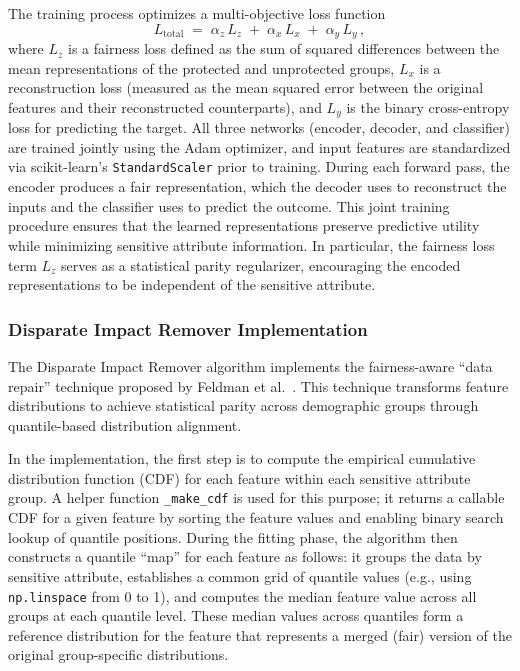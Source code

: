 \documentclass[12pt,a4paper,openright,twoside]{book}
\begin{document}
The training process optimizes a multi-objective loss function 
\[ 
L_{\text{total}} \;=\; \alpha_z\,L_z \;+\; \alpha_x\,L_x \;+\; \alpha_y\,L_y\,,
\] 
where $L_z$ is a fairness loss defined as the sum of squared differences between the mean representations of the protected and unprotected groups, $L_x$ is a reconstruction loss (measured as the mean squared error between the original features and their reconstructed counterparts), and $L_y$ is the binary cross-entropy loss for predicting the target. All three networks (encoder, decoder, and classifier) are trained jointly using the Adam optimizer, and input features are standardized via scikit-learn’s \texttt{StandardScaler} prior to training. During each forward pass, the encoder produces a fair representation, which the decoder uses to reconstruct the inputs and the classifier uses to predict the outcome. This joint training procedure ensures that the learned representations preserve predictive utility while minimizing sensitive attribute information. In particular, the fairness loss term $L_z$ serves as a statistical parity regularizer, encouraging the encoded representations to be independent of the sensitive attribute.

\subsubsection{Disparate Impact Remover Implementation}
The Disparate Impact Remover algorithm implements the fairness-aware “data repair” technique proposed by Feldman et al.~\cite{feldman2015certifyingremovingdisparateimpact}. This technique transforms feature distributions to achieve statistical parity across demographic groups through quantile-based distribution alignment.

In the implementation, the first step is to compute the empirical cumulative distribution function (CDF) for each feature within each sensitive attribute group. A helper function \texttt{\_make\_cdf} is used for this purpose; it returns a callable CDF for a given feature by sorting the feature values and enabling binary search lookup of quantile positions. During the fitting phase, the algorithm then constructs a quantile “map” for each feature as follows: it groups the data by sensitive attribute, establishes a common grid of quantile values (e.g., using \texttt{np.linspace} from 0 to 1), and computes the median feature value across all groups at each quantile level. These median values across quantiles form a reference distribution for the feature that represents a merged (fair) version of the original group-specific distributions.
\end{document}
